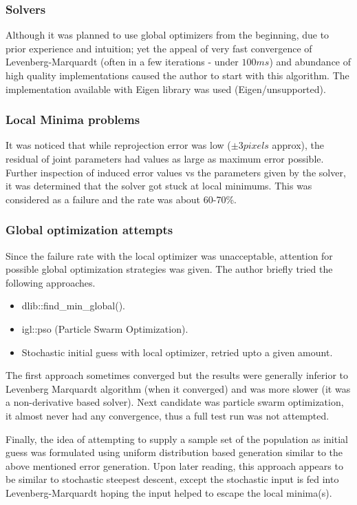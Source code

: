 \documentclass[english, printversion, nomenclature, notitle]{tuvisionthesis} %
\begin{document}
\subsubsection{Solvers}

Although it was planned to use global optimizers from the beginning, due to prior experience and intuition; yet the appeal of very fast convergence of Levenberg-Marquardt (often in a few iterations - under $100ms$) and abundance of high quality implementations caused the author to start with this algorithm. The implementation available with Eigen library was used (Eigen/unsupported).

\subsubsection{Local Minima problems}
It was noticed that while reprojection error was low ($\pm3 pixels$ approx), the residual of joint parameters had values as large as maximum error possible. Further inspection of induced error values vs the parameters given by the solver, it was determined that the solver got stuck at local minimums. This was considered as a failure and the rate was about 60-70\%.

\subsubsection{Global optimization attempts}
Since the failure rate with the local optimizer was unacceptable, attention for possible global optimization strategies was given. The author briefly tried the following approaches.
\begin{itemize}
	\item dlib::find\_min\_global(). 
	\item igl::pso (Particle Swarm Optimization). 
	\item Stochastic initial guess with local optimizer, retried upto a given amount.
\end{itemize}

The first approach sometimes converged but the results were generally inferior to Levenberg Marquardt algorithm (when it converged) and was more slower (it was a non-derivative based solver). Next candidate was particle swarm optimization, it almost never had any convergence, thus a full test run was not attempted.

Finally, the idea of attempting to supply a sample set of the population as initial guess was formulated using uniform distribution based generation similar to the above mentioned error generation. Upon later reading, this approach appears to be similar to stochastic steepest descent, except the stochastic input is fed into Levenberg-Marquardt hoping the input helped to escape the local minima(s). 
\end{document}
